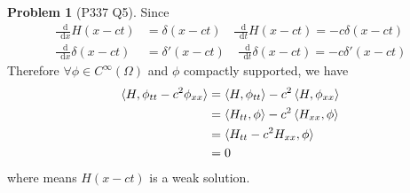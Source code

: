 \documentclass[twoside,11pt]{article}
\renewcommand*\d{\mathop{}\!\mathrm{d}}
\theoremstyle{definition}
\newtheorem{problem}{Problem}
\theoremstyle{remark}
\begin{document}
\begin{problem}[P337 Q5]
Since
\begin{align*}
    \frac{\d}{\d x}H(x-ct) &= \delta(x-ct)\quad
    \frac{\d}{\d t}H(x-ct) = -c\delta(x-ct)\\
    \frac{\d}{\d x}\delta(x-ct) &= \delta'(x-ct)\quad
    \frac{\d}{\d t}\delta(x-ct) = -c\delta'(x-ct)
\end{align*}
Therefore $\forall\phi\in C^\infty(\Omega)$ and $\phi$ compactly supported, we have
\begin{align*}
    \braket{H, \phi_{tt}-c^2\phi_{xx}} &= 
    \braket{H, \phi_{tt}} - c^2\braket{H, \phi_{xx}}\\
    &= \braket{H_{tt}, \phi} - c^2\braket{H_{xx}, \phi}\\
    &= \braket{H_{tt}-c^2H_{xx}, \phi}\\
    &= 0
\end{align*}
where means $H(x-ct)$ is a weak solution.

\end{problem}




\end{document}
